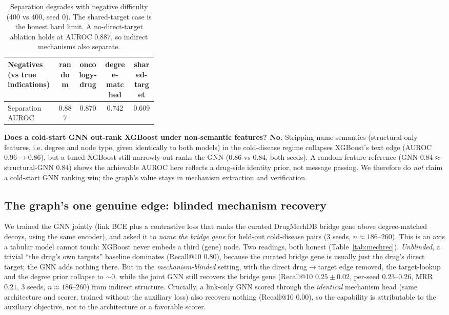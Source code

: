 \documentclass[11pt]{article}
\begin{document}
\begin{table}[H]
\centering\small
\begin{tabular}{>{\raggedright\arraybackslash}p{0.34\linewidth} cccc}
\toprule
\rowcolor{sriblue}\color{white}\textbf{Negatives (vs true indications)} & \color{white}\textbf{random} & \color{white}\textbf{oncology-drug} & \color{white}\textbf{degree-matched} & \color{white}\textbf{shared-target}\\
\midrule
\rowcolor{srirow} Separation AUROC & 0.887 & 0.870 & 0.742 & 0.609\\
\bottomrule
\end{tabular}
\caption{Separation degrades with negative difficulty (400 vs 400, seed 0). The
shared-target case is the honest hard limit. A no-direct-target ablation holds at
AUROC 0.887, so indirect mechanisms also separate.}
\label{tab:hardneg}
\end{table}

\textbf{Does a cold-start GNN out-rank XGBoost under non-semantic features? No.}
Stripping name semantics (structural-only features, i.e. degree and node type,
given identically to both models) in the cold-disease regime collapses XGBoost's
text edge (AUROC $0.96 \to 0.86$), but a tuned XGBoost still narrowly out-ranks the
GNN ($0.86$ vs $0.84$, both seeds). A random-feature reference (GNN $0.84 \approx$
structural-GNN $0.84$) shows the achievable AUROC here reflects a drug-side
identity prior, not message passing. We therefore do \emph{not} claim a cold-start
GNN ranking win; the graph's value stays in mechanism extraction and verification.

\subsection{The graph's one genuine edge: blinded mechanism recovery}
We trained the GNN jointly (link BCE plus a contrastive loss that ranks the
curated DrugMechDB bridge gene above degree-matched decoys, using the same
encoder), and asked it to \emph{name the bridge gene} for held-out cold-disease
pairs (3 seeds, $n\approx186$--$260$). This is an axis a tabular model cannot
touch: XGBoost never embeds a third (gene) node. Two readings, both honest
(Table~\ref{tab:mechrec}). \emph{Unblinded}, a trivial ``the drug's own targets''
baseline dominates (Recall@10 $0.80$), because the curated bridge gene is usually
just the drug's direct target; the GNN adds nothing there. But in the
\emph{mechanism-blinded} setting, with the direct drug$\to$target edge removed, the
target-lookup and the degree prior collapse to $\sim 0$, while the joint GNN still
recovers the bridge gene (Recall@10 $0.25 \pm 0.02$, per-seed $0.23$--$0.26$,
MRR $0.21$, 3 seeds, $n\approx186$--$260$) from indirect structure. Crucially, a link-only GNN scored through the \emph{identical}
mechanism head (same architecture and scorer, trained without the auxiliary loss)
also recovers nothing (Recall@10 $0.00$), so the capability is attributable to the
auxiliary objective, not to the architecture or a favorable scorer.
\end{document}
